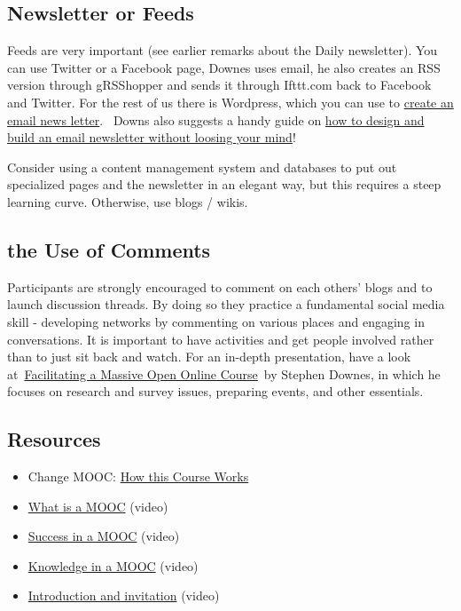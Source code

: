\hypertarget{newsletter-or-feeds}{%
\subsection{Newsletter or Feeds}\label{newsletter-or-feeds}}

Feeds are very important (see earlier remarks about the Daily
newsletter). You can use Twitter or a Facebook page, Downes uses email,
he also creates an RSS version through gRSShopper and sends it through
Ifttt.com back to Facebook and Twitter. For the rest of us there is
Wordpress, which you can use to
\href{http://www.wpbeginner.com/wp-tutorials/create-a-free-email-newsletter-service-using-wordpress/\%20}{create
an email news letter}.~ Downs also suggests a handy guide on
\href{http://www.smashingmagazine.com/2010/01/19/design-and-build-an-email-newsletter-without-losing-your-mind/}{how
to design and build an email newsletter without loosing your mind}!

Consider using a content management system and databases to put out
specialized pages and the newsletter in an elegant way, but this
requires a steep learning curve. Otherwise, use blogs / wikis.

\hypertarget{the-use-of-comments}{%
\subsection{the Use of Comments}\label{the-use-of-comments}}

Participants are strongly encouraged to comment on each others' blogs
and to launch discussion threads. By doing so they practice a
fundamental social media skill - developing networks by commenting on
various places and engaging in conversations. It is important to have
activities and get people involved rather than to just sit back and
watch. For an in-depth presentation, have a look
at~\href{http://www.downes.ca/presentation/290}{Facilitating a Massive
Open Online Course}~by Stephen Downes, in which he focuses on research
and survey issues, preparing events, and other essentials.

\hypertarget{resources}{%
\subsection{Resources}\label{resources}}

\begin{itemize}
\tightlist
\item
  Change MOOC: \href{http://change.mooc.ca/how.htm}{How this Course
  Works}
\item
  \href{http://www.youtube.com/watch?v=eW3gMGqcZQc}{What is a MOOC}
  (video)
\item
  \href{http://www.youtube.com/watch?v=r8avYQ5ZqM0}{Success in a MOOC}
  (video)
\item
  \href{http://www.youtube.com/watch?v=bWKdhzSAAG0}{Knowledge in a MOOC}
  (video)
\item
  \href{http://www.youtube.com/watch?v=mqnyhLfNH3I}{Introduction and
  invitation} (video)
\end{itemize}

